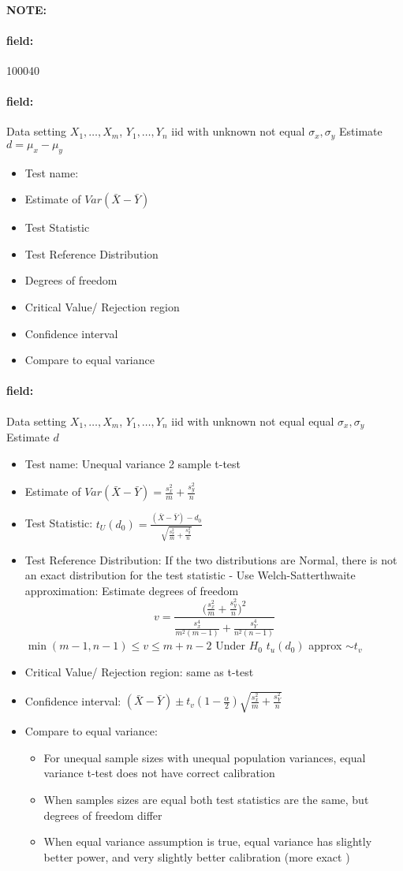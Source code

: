 \documentclass[12pt]{article}
\newenvironment{note}{\paragraph{NOTE:}}{}
\newenvironment{field}{\paragraph{field:}}{}
\begin{document}
\begin{note} \begin{field} \tiny 100040 \end{field}
 \begin{field}
  Data setting $X_1, \ldots , X_m$, $Y_1, \ldots, Y_n$ iid with unknown not equal  $\sigma_x, \sigma_y$ Estimate $d = \mu_x - \mu_y$
  \begin{itemize}
   \item Test name:
   \item Estimate of $Var(\bar{X} - \bar{Y})$
   \item Test Statistic
   \item Test Reference Distribution
   \item Degrees of freedom
   \item Critical Value/ Rejection region
   \item Confidence interval
   \item Compare to equal variance
  \end{itemize}
 \end{field}
 \begin{field}
  Data setting $X_1, \ldots , X_m$, $Y_1, \ldots, Y_n$ iid with unknown not equal equal  $\sigma_x, \sigma_y$ Estimate $d$
  \begin{itemize}
   \item Test name: Unequal variance 2 sample t-test
   \item Estimate of $Var(\bar{X} - \bar{Y}) = \frac{s_x^2}{m} + \frac{s_y^2}{n}$
   \item Test Statistic: $t_U(d_0) = \frac{(\bar{X} - \bar{Y}) - d_0}{\sqrt{\frac{s_x^2}{m} + \frac{s_y^2}{n}}}$
   \item Test Reference Distribution: If the two distributions are Normal, there is not an exact distribution for the test statistic -  Use Welch-Satterthwaite approximation: Estimate degrees of freedom
         $$ v = \frac{\big(\frac{s_x^2}{m} + \frac{s_y^2}{n}\big)^2}{\frac{s_x^4}{m^2(m-1)} + \frac{s_Y^4}{n^2(n-1)}}$$
         $\min(m-1,n-1) \leq v \leq m+n-2$
         Under $H_0$ $t_u(d_0) $ approx $\sim t_{v}$
   \item Critical Value/ Rejection region: same as t-test
   \item Confidence interval: $(\bar{X} - \bar{Y}) \pm t_v(1 - \frac{\alpha}{2})\sqrt{\frac{s_x^2}{m} + \frac{s_Y^2}{n}}$
   \item Compare to equal variance:
         \begin{itemize}
          \item For unequal sample sizes with unequal population variances, equal variance t-test does not have correct calibration
          \item When samples sizes are equal both test statistics are the same, but degrees of freedom differ
          \item When equal variance assumption is true, equal variance has slightly better power, and very slightly better calibration (more exact )
         \end{itemize}
  \end{itemize}
 \end{field}
\end{note}
\end{document}
